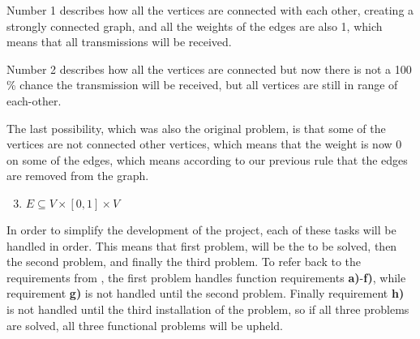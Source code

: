 Number 1 describes how all the vertices are connected with each other, creating a strongly connected graph, and all the weights of the edges are also 1, which means that all transmissions will be received.

Number 2 describes how all the vertices are connected but now there is not a 100 \% chance the transmission will be received, but all vertices are still in range of each-other.

\bigskip \noindent
The last possibility, which was also the original problem, is that some of the vertices are not connected other vertices, which means that the weight is now 0 on some of the edges, which means according to our previous rule that the edges are removed from the graph.

\begin{enumerate}
\setcounter{enumi}{2}
\item $E \subseteq V \times [0,1] \times V$ 
\end{enumerate}

In order to simplify the development of the project, each of these tasks will be handled in order.
This means that first problem, will be the to be solved, then the second problem, and finally the third problem.
To refer back to the requirements from , the first problem handles function requirements \textbf{a)}-\textbf{f)}, while requirement \textbf{g)} is not handled until the second problem.
Finally requirement \textbf{h)} is not handled until the third installation of the problem, so if all three problems are solved, all three functional problems will be upheld.